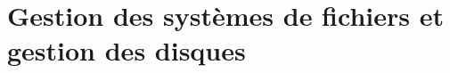     









\section{Gestion des systèmes de fichiers et gestion des disques}
\label{subsec:fs-disk}


